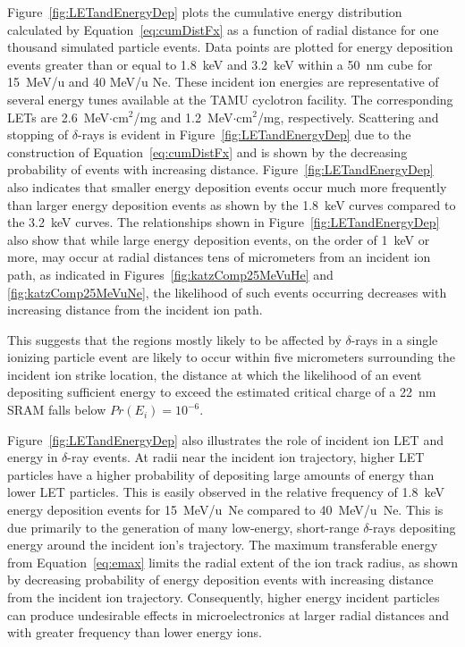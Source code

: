 Figure~\ref{fig:LETandEnergyDep} plots the cumulative energy distribution calculated by Equation~\ref{eq:cumDistFx} as a function of radial distance for one thousand simulated particle events. 
Data points are plotted for energy deposition events greater than or equal to 1.8~keV and 3.2~keV within a 50~nm cube for 15~MeV/u and 40 MeV/u Ne.
These incident ion energies are representative of several energy tunes available at the TAMU cyclotron facility.
The corresponding LETs are 2.6~MeV$\cdot$cm$^2$/mg and 1.2~MeV$\cdot$cm$^2$/mg, respectively.
Scattering and stopping of $\delta$-rays is evident in Figure~\ref{fig:LETandEnergyDep} due to the construction of Equation~\ref{eq:cumDistFx} and is shown by the decreasing probability of events with increasing distance. 
Figure~\ref{fig:LETandEnergyDep} also indicates that smaller energy deposition events occur much more frequently than larger energy deposition events as shown by the 1.8~keV curves compared to the 3.2~keV curves.
The relationships shown in Figure~\ref{fig:LETandEnergyDep} also show that while large energy deposition events, on the order of 1~keV or more, may occur at radial distances tens of micrometers from an incident ion path, as indicated in Figures~\ref{fig:katzComp25MeVuHe} and \ref{fig:katzComp25MeVuNe}, the likelihood of such events occurring decreases with increasing distance from the incident ion path.

This suggests that the regions mostly likely to be affected by $\delta$-rays in a single ionizing particle event are likely to occur within five micrometers surrounding the incident ion strike location, the distance at which the likelihood of an event depositing sufficient energy to exceed the estimated critical charge of a 22~nm SRAM falls below $Pr(E_i) = 10^{-6}$.

Figure~\ref{fig:LETandEnergyDep} also illustrates the role of incident ion LET and energy in $\delta$-ray events.
 At radii near the incident ion trajectory, higher LET particles have a higher probability of depositing large amounts of energy than lower LET particles.
 This is easily observed in the relative frequency of 1.8~keV energy deposition events for 15~MeV/u~Ne compared to 40~MeV/u~Ne.
 This is due primarily to the generation of many low-energy, short-range $\delta$-rays depositing energy around the incident ion's trajectory.
 The maximum transferable energy from Equation~\ref{eq:emax} limits the radial extent of the ion track radius, as shown by decreasing probability of energy deposition events with increasing distance from the incident ion trajectory.
 Consequently, higher energy incident particles can produce undesirable effects in microelectronics at larger radial distances and with greater frequency than lower energy ions.

